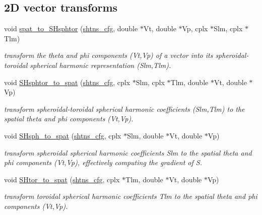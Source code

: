 \subsection*{2\+D vector transforms}
\begin{DoxyCompactItemize}
\item 
void \hyperlink{group__sht_gad85f2449328fa2b730fe79688120989b}{spat\+\_\+to\+\_\+\+S\+Hsphtor} (\hyperlink{shtns_8h_ab7bd78e5cbeb4ed18782d018195fde00}{shtns\+\_\+cfg}, double $\ast$Vt, double $\ast$Vp, cplx $\ast$Slm, cplx $\ast$Tlm)
\begin{DoxyCompactList}\small\item\em transform the theta and phi components (Vt,Vp) of a vector into its spheroidal-\/toroidal spherical harmonic representation (Slm,Tlm). \end{DoxyCompactList}\item 
void \hyperlink{group__sht_ga6c6f55a1cb89abacbc53d79a4c13456f}{S\+Hsphtor\+\_\+to\+\_\+spat} (\hyperlink{shtns_8h_ab7bd78e5cbeb4ed18782d018195fde00}{shtns\+\_\+cfg}, cplx $\ast$Slm, cplx $\ast$Tlm, double $\ast$Vt, double $\ast$Vp)
\begin{DoxyCompactList}\small\item\em transform spheroidal-\/toroidal spherical harmonic coefficients (Slm,Tlm) to the spatial theta and phi components (Vt,Vp). \end{DoxyCompactList}\item 
void \hyperlink{group__sht_ga665f43382fa5fc22b63ebcd8d9a0cf71}{S\+Hsph\+\_\+to\+\_\+spat} (\hyperlink{shtns_8h_ab7bd78e5cbeb4ed18782d018195fde00}{shtns\+\_\+cfg}, cplx $\ast$Slm, double $\ast$Vt, double $\ast$Vp)
\begin{DoxyCompactList}\small\item\em transform spheroidal spherical harmonic coefficients Slm to the spatial theta and phi components (Vt,Vp), effectively computing the gradient of S. \end{DoxyCompactList}\item 
void \hyperlink{group__sht_ga4db8b51177f7affe61c28a3e4abe3fe5}{S\+Htor\+\_\+to\+\_\+spat} (\hyperlink{shtns_8h_ab7bd78e5cbeb4ed18782d018195fde00}{shtns\+\_\+cfg}, cplx $\ast$Tlm, double $\ast$Vt, double $\ast$Vp)
\begin{DoxyCompactList}\small\item\em transform toroidal spherical harmonic coefficients Tlm to the spatial theta and phi components (Vt,Vp). \end{DoxyCompactList}\end{DoxyCompactItemize}
